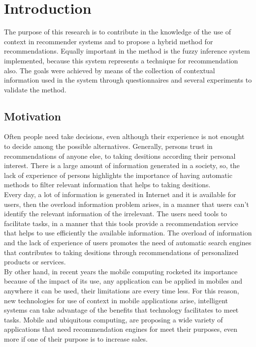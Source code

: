 \chapter{Introduction} \label{introduction} 

The purpose of this research is to contribute in the knowledge of the
use of context in recommender systems and to propose a hybrid method
for recommendations. Equally important in the method is the fuzzy
inference system implemented, because this system represents a
technique for recommendation also. The goals were achieved by means of
the collection of contextual information used in the system through
questionnaires and several experiments to validate the method.

\section{Motivation}

Often people need take decisions, even although their experience is
not enought to decide among the possible alternatives. Generally,
persons trust in recommendations of anyone else, to taking desitions
according their personal interest. There is a large amount of
information generated in a society, so, the lack of experience of
persons highlights the importance of having automatic methods to
filter relevant information that helps to taking desitions. \\Every day,
a lot of information is generated in Internet and it is available for
users, then the overload information problem arises, in a manner that
users can't identify the relevant information of the irrelevant. The
users need tools to facilitate tasks, in a manner that this tools
provide a recommendation service that helps to use efficiently the
available information. The overload of information and the lack of
experience of users promotes the need of automatic search engines
that contributes to taking desitions through recommendations of
personalized products or services. \\
By other hand, in recent years  the mobile computing rocketed its
importance because of the impact of its use, any application can be
applied in mobiles and anywhere it can be used, their limitations
are every time less. For this reason, new technologies for use of
context in mobile applications arise, intelligent systems can take
advantage of the benefits that technology facilitates to meet tasks.
Mobile and ubiquitous
computing\cite{noguera2012mobile},\cite{chiou2010adaptive} are
proposing a wide variety of applications that need recommendation
engines for meet their purposes, even more if one of their purpose 
is to increase sales.

